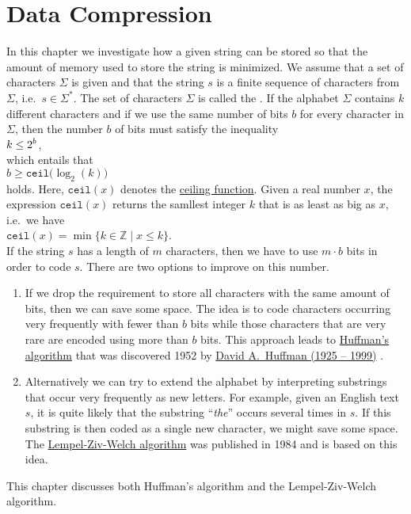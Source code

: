 \chapter{Data Compression}
In this chapter we investigate how a given string can be stored so that the amount of memory used to store the
string is minimized.   We assume that a set of characters $\Sigma$ is given and that the string $s$ is a finite
sequence of characters from $\Sigma$, i.e.~$s \in \Sigma^*$.  The set of characters $\Sigma$ is called the
.  If the alphabet $\Sigma$ contains $k$ different characters and if we use the same number of
bits $b$ for every character in $\Sigma$, then the number $b$ of bits must satisfy the inequality
\\[0.2cm]
\hspace*{1.3cm}
$\displaystyle k \leq 2^b$,
\\[0.2cm]
which entails that 
\\[0.2cm]
\hspace*{1.3cm}
$b \geq \mathtt{ceil}\bigl(\log_2(k)\bigr)$
\\[0.2cm]
holds.  Here, $\mathtt{ceil}(x)$ denotes the
\href{https://en.wikipedia.org/wiki/Floor_and_ceiling_functions}{ceiling function}.  Given a real number $x$,
the expression $\mathtt{ceil}(x)$ returns the samllest integer $k$ that is as least as big as $x$, i.e.~we have
\\[0.2cm]
\hspace*{1.3cm}
$\mathtt{ceil}(x) = \min \{ k \in \mathbb{Z} \mid x \leq k \}$. 
\\[0.2cm]
If the string $s$ has a length of $m$ characters, then we have to use $m \cdot b$ bits in order to code $s$. 
There are two options to improve on this number.
\begin{enumerate}
\item If we drop the requirement to store all characters with the same amount of bits, then we can save some space.
      The idea is to code characters occurring very frequently with fewer than $b$ bits while those characters
      that are very rare are encoded using more than $b$ bits.  This approach leads to 
      \href{https://en.wikipedia.org/wiki/Huffman_coding}{Huffman's algorithm} that was discovered 1952 by 
      \href{https://en.wikipedia.org/wiki/David_A._Huffman}{David A.~Huffman (1925 -- 1999)} \cite{huffman:52}.
\item Alternatively we can try to extend the alphabet by interpreting substrings that occur very frequently as
      new letters.  For example, given an English text $s$, it is quite likely that the substring 
      ``\emph{the}'' occurs several times in $s$.  If this substring is then coded as a single new character,
      we might save some space.  The 
      \href{https://en.wikipedia.org/wiki/Lempel-Ziv-Welch}{Lempel-Ziv-Welch algorithm} 
      \cite{ziv:77,ziv:78,welch:84} was published in 1984 and is based on this idea.

\end{enumerate}
This chapter discusses both Huffman's algorithm and the Lempel-Ziv-Welch algorithm.

